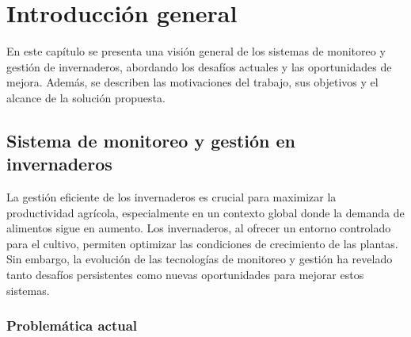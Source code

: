 
\chapter{Introducción general} %

\label{Chapter1} %
\label{IntroGeneral}


\newcommand{\keyword}[1]{\textbf{#1}}
\newcommand{\tabhead}[1]{\textbf{#1}}
\newcommand{\code}[1]{\texttt{#1}}
\newcommand{\file}[1]{\texttt{\bfseries#1}}
\newcommand{\option}[1]{\texttt{\itshape#1}}
\newcommand{\grados}{$^{\circ}$}


En este capítulo se presenta una visión general de los sistemas de monitoreo y gestión de invernaderos, abordando los desafíos actuales y las oportunidades de mejora. Además, se describen las motivaciones del trabajo, sus objetivos y el alcance de la solución propuesta. 
\section{Sistema de monitoreo y gestión en invernaderos}

La gestión eficiente de los invernaderos es crucial para maximizar la productividad agrícola, especialmente en un contexto global donde la demanda de alimentos sigue en aumento. Los invernaderos, al ofrecer un entorno controlado para el cultivo, permiten optimizar las condiciones de crecimiento de las plantas. Sin embargo, la evolución de las tecnologías de monitoreo y gestión ha revelado tanto desafíos persistentes como nuevas oportunidades para mejorar estos sistemas.

\subsection{Problemática actual}

